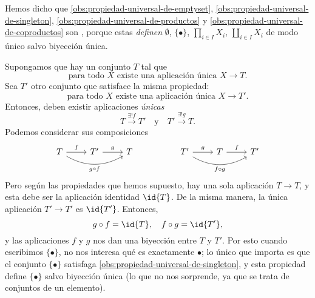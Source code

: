 Hemos dicho que \ref{obs:propiedad-universal-de-emptyset},
\ref{obs:propiedad-universal-de-singleton},
\ref{obs:propiedad-universal-de-productos} y
\ref{obs:propiedad-universal-de-coproductos} son
, porque estas \emph{definen} $\emptyset$,
$\{ \bullet \}$, $\prod_{i\in I} X_i$, $\coprod_{i\in I} X_i$ de modo único
salvo biyección única.

\begin{ejemplo}
  Supongamos que hay un conjunto $T$ tal que
  $$\text{para todo }X\text{ existe una aplicación única }X \to T.$$
  Sea $T'$ otro conjunto que satisface la misma propiedad:
  $$\text{para todo }X\text{ existe una aplicación única }X \to T'.$$
  Entonces, deben existir aplicaciones \emph{únicas}
  $$T \xrightarrow{\exists! f} T' \quad\text{y}\quad T' \xrightarrow{\exists! g} T.$$
  Podemos considerar sus composiciones
  \[ \begin{tikzcd}
      T \ar{r}{f} \ar[bend right]{rr}[swap]{g\circ f} & T' \ar{r}{g} & T & & T' \ar{r}{g} \ar[bend right]{rr}[swap]{f\circ g} & T \ar{r}{f} & T'
    \end{tikzcd} \]
  Pero según las propiedades que hemos supuesto, hay una sola aplicación
  $T\to T$, y esta debe ser la aplicación identidad $\id{T}$. De la misma
  manera, la única aplicación $T'\to T'$ es $\id{T'}$. Entonces,
  $$g\circ f = \id{T},\quad f\circ g = \id{T'},$$
  y las aplicaciones $f$ y $g$ nos dan una biyección entre $T$ y $T'$. Por esto
  cuando escribimos $\{ \bullet \}$, no nos interesa qué es exactamente
  $\bullet$; lo único que importa es que el conjunto $\{ \bullet \}$ satisfaga
  \ref{obs:propiedad-universal-de-singleton}, y esta propiedad define
  $\{ \bullet \}$ salvo biyección única (lo que no nos sorprende, ya que
  se trata de conjuntos de un elemento).
\end{ejemplo}


